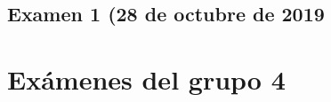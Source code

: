 \documentclass[a4paper,12pt,twoside]{book}
\begin{document}
\section{Examen 1 (28 de octubre de 2019}

\chapter{Exámenes del grupo 4}
\end{document}
